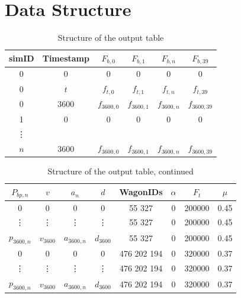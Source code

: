 \section{Data Structure}
\label{sec:DataStructure}

\bigskip
\begin{table}[H]
	\centering
	\begin{tabular}{*{6}{c}}\toprule
		simID & Timestamp & $F_{b,0}$ & $F_{b,1}$ & $F_{b,n}$ & $F_{b,39}$ \\ \midrule
		0 & 0 & 0 & 0 & 0 & 0 \\
		0 & $t$ & $f_{t,0}$ & $f_{t,1}$ & $f_{t,n}$ & $f_{t,39}$ \\
		0 & 3600 & $f_{3600,0}$ & $f_{3600,1}$ & $f_{3600,n}$ & $f_{3600,39}$ \\
		1 & 0 & 0 & 0 & 0 & 0 \\
		\vdots & & & & & \\
		$n$ & 3600 & $f_{3600,0}$ & $f_{3600,1}$ & $f_{3600,n}$ & $f_{3600,39}$ \\
	\end{tabular}
	\caption{Structure of the output table}
	\label{tab:datastructure}
\end{table}
\bigskip

\bigskip
\begin{table}[H]
	\centering
	\begin{tabular}{*{8}{c}}\toprule
		$P_{bp,n}$ & $v$ & $a_{n}$ & $d$ & WagonIDs & $\alpha$ & $F_{t}$ & $\mu$ \\ \midrule
		0 & 0 & 0 & 0 & 55 327 & 0 & 200000 & 0.45 \\
		\vdots & \vdots & \vdots & \vdots & 55 327 & 0 & 200000 & 0.45 \\
		$p_{3600,n}$ & $v_{3600}$ & $a_{3600,n}$ & $d_{3600}$ & 55 327 & 0 & 200000 & 0.45 \\
		0 & 0 & 0 & 0 & 476 202 194 & 0 & 320000 & 0.37 \\
		\vdots & \vdots & \vdots & \vdots & 476 202 194 & 0 & 320000 & 0.37 \\
		$p_{3600,n}$ & $v_{3600}$ & $a_{3600,n}$ & $d_{3600}$ & 476 202 194 & 0 & 320000 & 0.37
	\end{tabular}
	\caption{Structure of the output table, continued}
	\label{tab:datastructure2}
\end{table}
\bigskip

